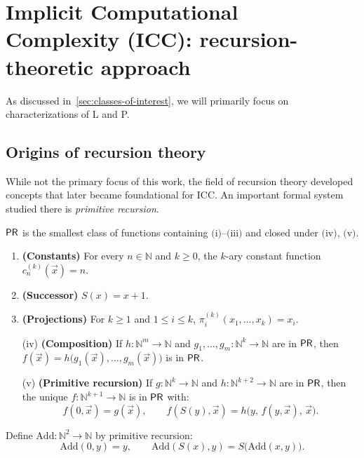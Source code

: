\chapter{Implicit Computational Complexity (ICC): recursion-theoretic approach}
\label{chap:recursion-theory}

As discussed in~\ref{sec:classes-of-interest}, we will primarily focus on characterizations of L and P.


\section{Origins of recursion theory}
While not the primary focus of this work, the field of recursion theory developed concepts
that later became foundational for ICC\@. An important formal system studied there is \emph{primitive recursion}.

\begin{definition}
\(\mathsf{PR}\) is the smallest class of functions containing \(\text{(i)}\)--\(\text{(iii)}\) and closed under \(\text{(iv)}\), \(\text{(v)}\).
\begin{enumerate}[label=(\roman*)]
\item \textbf{(Constants)} For every \(n\in\mathbb{N}\) and \(k\ge 0\), the \(k\)-ary constant function
      \(c_{n}^{(k)}(\vec x)=n\).
\item \textbf{(Successor)} \(S(x)=x+1\).
\item \textbf{(Projections)} For \(k\ge 1\) and \(1\le i\le k\),
      \(\pi_i^{(k)}(x_1,\dots,x_k)=x_i\).
\item[(iv)] \textbf{(Composition)} If \(h:\mathbb{N}^m\to\mathbb{N}\) and
      \(g_1,\dots,g_m:\mathbb{N}^k\to\mathbb{N}\) are in \(\mathsf{PR}\), then
      \(f(\vec x)=h\big(g_1(\vec x),\dots,g_m(\vec x)\big)\) is in \(\mathsf{PR}\).
\item[(v)] \textbf{(Primitive recursion)} If \(g:\mathbb{N}^k\to\mathbb{N}\) and
      \(h:\mathbb{N}^{k+2}\to\mathbb{N}\) are in \(\mathsf{PR}\), then the unique
      \(f:\mathbb{N}^{k+1}\to\mathbb{N}\) is in \(\mathsf{PR}\) with:
      \[
      f(0,\vec x)=g(\vec x),\qquad
      f(S(y),\vec x)=h\big(y,\,f(y,\vec x),\,\vec x\big).
      \]

\end{enumerate}
\end{definition}

\begin{example}[Addition]
Define \(\mathrm{Add}:\mathbb{N}^2\to\mathbb{N}\) by primitive recursion:
\[
\mathrm{Add}(0,y)=y, \qquad
\mathrm{Add}(S(x),y)=S\big(\mathrm{Add}(x,y)\big).
\]
\end{example}


